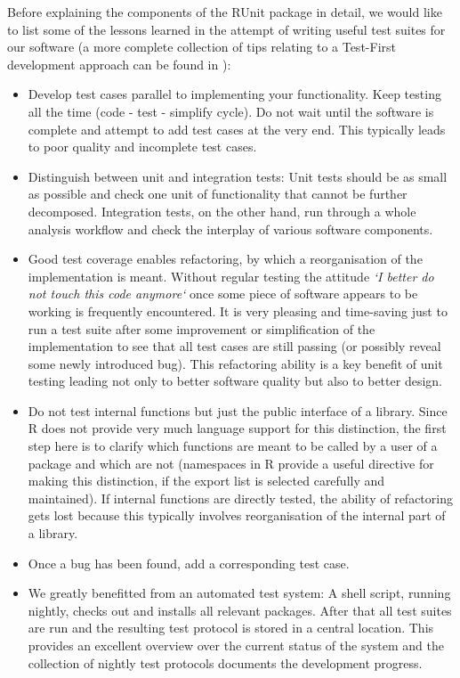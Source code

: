 \documentclass[12pt, a4paper]{article}
\begin{document}
Before explaining the components of the RUnit package in detail,
we would like to list some of the lessons learned in the attempt of
writing useful test suites for our software (a more complete collection
of tips relating to a Test-First development approach can be found in \cite{tfg}):
\begin{itemize}

\item {Develop test cases parallel to implementing your
    functionality. Keep testing all the time (code - test - simplify
    cycle). Do not wait until the software is complete and attempt to
    add test cases at the very end. This typically leads to poor quality
    and incomplete test cases.}

\item{Distinguish between unit and integration tests: Unit tests
    should be as small as possible and check one unit of functionality
    that cannot be further decomposed. Integration tests, on the other
    hand, run through a whole analysis workflow and check the
    interplay of various software components.}

\item{Good test coverage enables refactoring, by which a
        reorganisation of the implementation is meant. Without regular testing the
        attitude {\it `I better do not touch this code anymore`} once some piece
        of software appears to be working is frequently
        encountered. It is very pleasing and time-saving just to run a
        test suite after some improvement or simplification of the
        implementation to see that all test cases are still passing
        (or possibly reveal some newly introduced bug). This
        refactoring ability is a key benefit of unit testing leading
        not only to better software quality but also to better design.}

\item{Do not test internal functions but just the public interface of
    a library. Since R does not provide very much language support for this
    distinction, the first step here is to clarify which
    functions are meant to be called by a user of a package and which are
    not (namespaces in R provide a useful directive for making this distinction, if
    the export list is selected carefully and maintained). 
    If internal functions are directly tested, the ability of
    refactoring gets lost because this typically involves
    reorganisation of the internal part of a library.}

\item {Once a bug has been found, add a corresponding test case.}

\item{We greatly benefitted from an automated test system: A
    shell script, running nightly, checks out and installs all relevant packages.
    After that all test suites are run and the resulting test protocol is stored
    in a central location. This provides an excellent overview over the current
    status of the system and the collection of nightly test protocols documents
    the development progress.}

\end{itemize}
\end{document}
